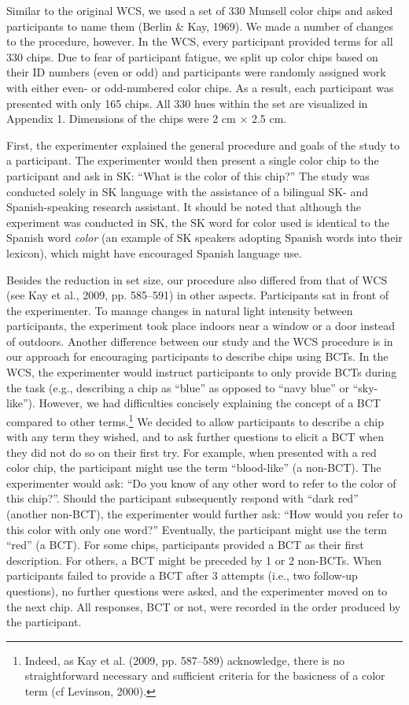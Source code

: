 \documentclass[
  english,
  ,man,floatsintext]{apa6}
\begin{document}
Similar to the original WCS, we used a set of 330 Munsell color chips and asked participants to name them (Berlin \& Kay, 1969). We made a number of changes to the procedure, however. In the WCS, every participant provided terms for all 330 chips. Due to fear of participant fatigue, we split up color chips based on their ID numbers (even or odd) and participants were randomly assigned work with either even- or odd-numbered color chips. As a result, each participant was presented with only 165 chips. All 330 hues within the set are visualized in Appendix 1. Dimensions of the chips were 2 cm × 2.5 cm.

First, the experimenter explained the general procedure and goals of the study to a participant. The experimenter would then present a single color chip to the participant and ask in SK: \enquote{What is the color of this chip?} The study was conducted solely in SK language with the assistance of a bilingual SK- and Spanish-speaking research assistant. It should be noted that although the experiment was conducted in SK, the SK word for color used is identical to the Spanish word \emph{color} (an example of SK speakers adopting Spanish words into their lexicon), which might have encouraged Spanish language use.

Besides the reduction in set size, our procedure also differed from that of WCS (see Kay et al., 2009, pp. 585--591) in other aspects. Participants sat in front of the experimenter. To manage changes in natural light intensity between participants, the experiment took place indoors near a window or a door instead of outdoors. Another difference between our study and the WCS procedure is in our approach for encouraging participants to describe chips using BCTs. In the WCS, the experimenter would instruct participants to only provide BCTs during the task (e.g., describing a chip as \enquote{blue} as opposed to \enquote{navy blue} or \enquote{sky-like}). However, we had difficulties concisely explaining the concept of a BCT compared to other terms.\footnote{Indeed, as Kay et al. (2009, pp. 587--589) acknowledge, there is no straightforward necessary and sufficient criteria for the basicness of a color term (cf Levinson, 2000).} We decided to allow participants to describe a chip with any term they wished, and to ask further questions to elicit a BCT when they did not do so on their first try. For example, when presented with a red color chip, the participant might use the term \enquote{blood-like} (a non-BCT). The experimenter would ask: \enquote{Do you know of any other word to refer to the color of this chip?}. Should the participant subsequently respond with \enquote{dark red} (another non-BCT), the experimenter would further ask: \enquote{How would you refer to this color with only one word?} Eventually, the participant might use the term \enquote{red} (a BCT). For some chips, participants provided a BCT as their first description. For others, a BCT might be preceded by 1 or 2 non-BCTs. When participants failed to provide a BCT after 3 attempts (i.e., two follow-up questions), no further questions were asked, and the experimenter moved on to the next chip. All responses, BCT or not, were recorded in the order produced by the participant.
\end{document}
